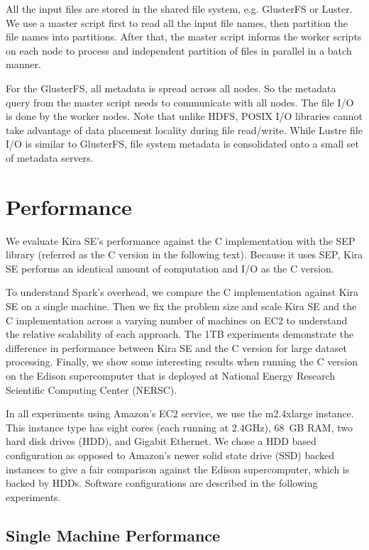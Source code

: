 \documentclass[conference]{IEEEtran}
\begin{document}
All the input files are stored in the shared file system, e.g. GlusterFS or Luster. We use a master script
first to read all the input file names, then partition the file names into partitions. After that, the master
script informs the worker scripts on each node to process and independent partition of files in parallel 
in a batch manner.

For the GlusterFS, all metadata is spread across all nodes. So the metadata query from the master script
needs to communicate with all nodes. The file I/O is done by the worker nodes. Note that unlike HDFS, 
POSIX I/O libraries cannot take advantage of data placement locality during file read/write. While Lustre 
file I/O is similar to GlusterFS, file system metadata is consolidated onto a small set of metadata servers.




\section{Performance}
\label{sec:Performance}

We evaluate Kira SE's performance against the C implementation with the SEP library
(referred as the C version in the following text). Because it uses SEP, Kira SE performs an identical amount of
computation and I/O as the C version.

To understand Spark's overhead, we compare the C implementation against Kira SE on a single
machine. Then we fix the problem size and scale Kira SE and the C implementation across a
varying number of machines on EC2 to understand the relative scalability of each approach.
The 1TB experiments demonstrate the difference in performance between Kira SE and the C version
for large dataset processing. Finally, we show some interesting results when running the C
version on the Edison supercomputer that is deployed at National Energy Research Scientific Computing Center (NERSC).

In all experiments using Amazon's EC2 service, we use the m2.4xlarge instance.
This instance type has eight cores (each running at 2.4GHz), 68~GB RAM, two hard disk drives (HDD), and Gigabit Ethernet. 
We chose a HDD based configuration as opposed to Amazon's newer solid state drive (SSD) backed instances to give a fair comparison
against the Edison supercomputer, which is backed by HDDs. 
Software configurations are described in the following experiments.

\subsection{Single Machine Performance}
\label{sec:Performance-scaleup}
\end{document}
